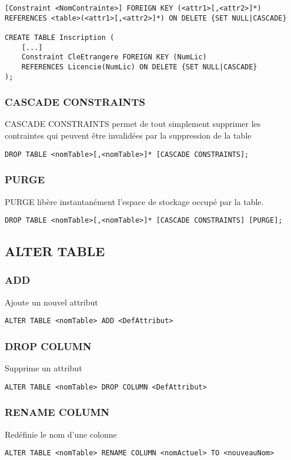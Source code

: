 \documentclass[10pt,a4paper,twoside]{article}
\begin{document}
\begin{verbatim}
[Constraint <NomContrainte>] FOREIGN KEY (<attr1>[,<attr2>]*)
REFERENCES <table>(<attr1>[,<attr2>]*) ON DELETE {SET NULL|CASCADE}

CREATE TABLE Inscription (
    [...]
    Constraint CleEtrangere FOREIGN KEY (NumLic) 
    REFERENCES Licencie(NumLic) ON DELETE {SET NULL|CASCADE}
);
\end{verbatim}

\subsubsection{CASCADE CONSTRAINTS} 
CASCADE CONSTRAINTS permet de tout simplement supprimer les contraintes qui peuvent être invalidées par la suppression de la table
\begin{verbatim}
DROP TABLE <nomTable>[,<nomTable>]* [CASCADE CONSTRAINTS];
\end{verbatim}

\subsubsection{PURGE} 
PURGE libère instantanément l’espace de stockage occupé par la table. 
\begin{verbatim}
DROP TABLE <nomTable>[,<nomTable>]* [CASCADE CONSTRAINTS] [PURGE];
\end{verbatim}

\subsection{ALTER TABLE}
\subsubsection{ADD} 
Ajoute un nouvel attribut
\begin{verbatim}
ALTER TABLE <nomTable> ADD <DefAttribut>
\end{verbatim}

\subsubsection{DROP COLUMN} 
Supprime un attribut
\begin{verbatim}
ALTER TABLE <nomTable> DROP COLUMN <DefAttribut>
\end{verbatim}

\subsubsection{RENAME COLUMN} 
Redéfinie le nom d'une colonne
\begin{verbatim}
ALTER TABLE <nomTable> RENAME COLUMN <nomActuel> TO <nouveauNom> 
\end{verbatim}
\end{document}
